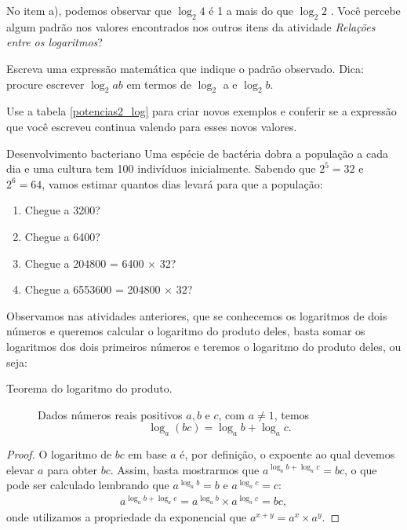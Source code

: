 \begin{reflection}
No item a), podemos observar que $\log_2 4$ é 1 a mais do que $\log_2 2$ . Você percebe algum padrão nos valores encontrados nos outros itens da atividade \textit{Relações entre os logaritmos}?

Escreva uma expressão matemática que indique o padrão observado. Dica: procure escrever $\log_2 ab$ em termos de $\log_2$ a e $\log_2 b$.

Use a tabela \ref{potencias2_log} para criar novos exemplos e conferir se a expressão que você escreveu continua valendo para esses novos valores.
\end{reflection}



\begin{task}{Desenvolvimento bacteriano}
Uma espécie de bactéria dobra a população a cada dia e uma cultura tem 100 indivíduos inicialmente. Sabendo que $2^5=32$ e $2^6=64$, vamos estimar quantos dias levará para que a população: 
\begin{enumerate}
\item Chegue a 3200?
\item Chegue a 6400?
\item Chegue a 204800 = 6400 $\times$ 32?
\item Chegue a 6553600 = 204800 $\times$ 32?
\end{enumerate}
\end{task}

\label{explore_log_prod}


Observamos nas atividades anteriores, que se conhecemos os logaritmos de dois números e queremos calcular o logaritmo do produto deles, basta somar os logaritmos dos dois primeiros números e teremos o logaritmo do produto deles, ou seja:


\begin{description}
\item[Teorema do logaritmo do produto.]\label{teo_log_prod}
Dados números reais positivos $a,b$ e $c$, com $a \neq 1$, temos
$$
\log_a(bc) = \log_a b + \log_a c.
$$
\end{description}
\begin{proof}
O logaritmo de $bc$ em base $a$ é, por definição, o expoente ao qual devemos elevar $a$ para obter $bc$. Assim, basta mostrarmos que $a^{\log_a b + \log_a c} =bc$, o que pode ser calculado lembrando que $a^{\log_a b}=b$ e $a^{\log_a c}=c$:
\begin{align*}
a^{\log_a b + \log_a c} = a^{\log_a b} \times a^{\log_a c} =bc,
\end{align*}
onde utilizamos a propriedade da exponencial que $a^{x+y} = a^{x} \times a^{y}$.
\end{proof}

